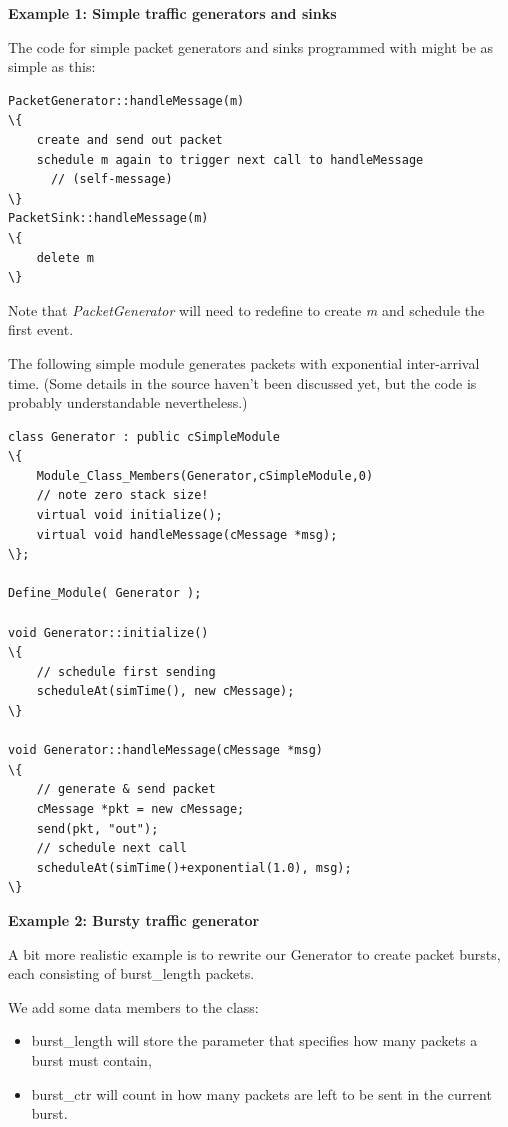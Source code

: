 \textbf{Example 1: Simple traffic generators and sinks}


The code for simple packet generators and sinks programmed with  might
be as simple as this:

\begin{Verbatim}[commandchars=\\\{\}]
PacketGenerator::handleMessage(m)
\{
    create and send out packet
    schedule m again to trigger next call to handleMessage
      // (self-message)
\}
PacketSink::handleMessage(m)
\{
    delete m
\}
\end{Verbatim}



Note that \textit{PacketGenerator} will need to redefine 
to create \textit{m} and schedule the first event.

The following simple module generates packets with exponential
inter-arrival time. (Some details in the source haven't been
discussed yet, but the code is probably understandable nevertheless.)


\begin{Verbatim}[commandchars=\\\{\}]
class Generator : public cSimpleModule
\{
    Module_Class_Members(Generator,cSimpleModule,0)
    // note zero stack size!
    virtual void initialize();
    virtual void handleMessage(cMessage *msg);
\};

Define_Module( Generator );

void Generator::initialize()
\{
    // schedule first sending
    scheduleAt(simTime(), new cMessage);
\}

void Generator::handleMessage(cMessage *msg)
\{
    // generate & send packet
    cMessage *pkt = new cMessage;
    send(pkt, "out");
    // schedule next call
    scheduleAt(simTime()+exponential(1.0), msg);
\}
\end{Verbatim}



\textbf{Example 2: Bursty traffic generator}


A bit more realistic example is to rewrite our Generator to create
packet bursts, each consisting of burst\_length packets.


We add some data members to the class:
\begin{itemize}
\item{burst\_length will store the parameter that specifies how many
    packets a burst must contain,}
\item{burst\_ctr will count in how many packets are left to be sent
    in the current burst.}
\end{itemize}

